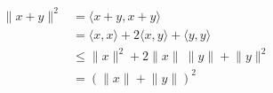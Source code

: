 \documentclass[preview]{standalone}
\begin{document}
\begin{align*}
\lVert x + y \rVert ^{2} & = \langle x+y, x+y \rangle \\& = \langle x, x \rangle + 2\langle x, y \rangle + \langle y, y \rangle \\& \leq \lVert x \rVert ^{2} + 2 \lVert x \rVert \ \lVert y \rVert + \lVert  y \rVert ^{2} \\&  = (\lVert x \rVert + \lVert  y \rVert)^{2}
\end{align*}
\end{document}
